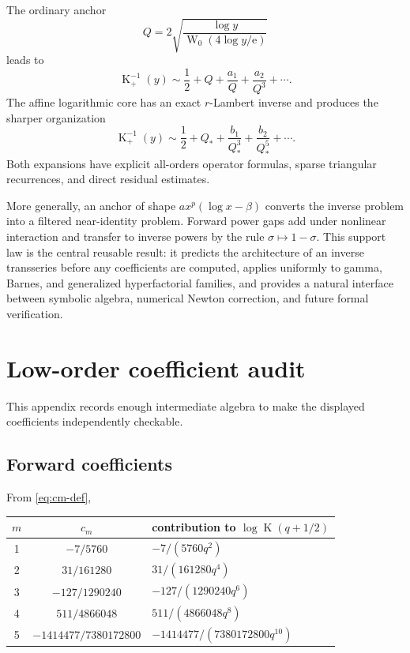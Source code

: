 \documentclass[11pt,oneside]{article}
\theoremstyle{plain}
\theoremstyle{definition}
\theoremstyle{remark}
\newcommand{\Kfun}{\operatorname{K}}
\newcommand{\W}{\operatorname{W}}
\newcommand{\e}{\mathrm{e}}
\begin{document}
The ordinary anchor
\[
 Q=2\sqrt{\frac{\log y}{\W_0(4\log y/\e)}}
\]
leads to
\[
 \Kfun_+^{-1}(y)
 \sim\frac12+Q+\frac{a_1}{Q}+\frac{a_2}{Q^3}+\cdots.
\]
The affine logarithmic core has an exact \(r\)-Lambert inverse and produces the
sharper organization
\[
 \Kfun_+^{-1}(y)
 \sim\frac12+Q_*+\frac{b_1}{Q_*^3}
 +\frac{b_2}{Q_*^5}+\cdots.
\]
Both expansions have explicit all-orders operator formulas, sparse triangular
recurrences, and direct residual estimates.

More generally, an anchor of shape \(a x^p(\log x-\beta)\) converts the inverse
problem into a filtered near-identity problem.  Forward power gaps add under
nonlinear interaction and transfer to inverse powers by the rule
\(\sigma\mapsto1-\sigma\).  This support law is the central reusable result: it
predicts the architecture of an inverse transseries before any coefficients are
computed, applies uniformly to gamma, Barnes, and generalized hyperfactorial
families, and provides a natural interface between symbolic algebra, numerical
Newton correction, and future formal verification.

\appendix

\section{Low-order coefficient audit}
\label{app:coefficient-audit}

This appendix records enough intermediate algebra to make the displayed
coefficients independently checkable.

\subsection{Forward coefficients}

From \eqref{eq:cm-def},
\begin{center}
\begin{tabular}{@{}ccl@{}}
\toprule
\(m\) & \(c_m\) & contribution to \(\log\Kfun(q+1/2)\)\\
\midrule
1 & \(-7/5760\) & \(-7/(5760q^2)\)\\
2 & \(31/161280\) & \(31/(161280q^4)\)\\
3 & \(-127/1290240\) & \(-127/(1290240q^6)\)\\
4 & \(511/4866048\) & \(511/(4866048q^8)\)\\
5 & \(-1414477/7380172800\) & \(-1414477/(7380172800q^{10})\)\\
\bottomrule
\end{tabular}
\end{center}
\end{document}
